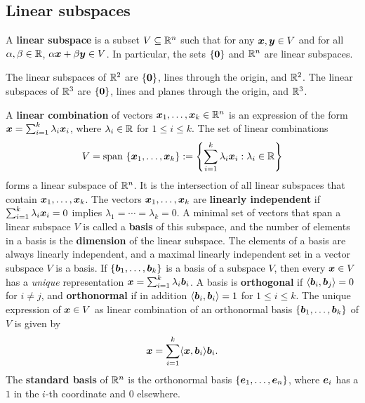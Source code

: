 \subsection{Linear subspaces}
A \textbf{linear subspace} is a subset $V\subseteq \mathbb{R}^n$ such that for any $\bm{x},\bm{y}\in V$ and for all $\alpha,\beta\in \mathbb{R}$, $\alpha \bm{x}+\beta \bm{y}\in V$. In particular, the sets $\{\bm{0}\}$ and $\mathbb{R}^n$ are linear subspaces. 

\begin{example}
The linear subspaces of $\mathbb{R}^2$ are $\{\bm{0}\}$, lines through the origin, and $\mathbb{R}^2$. The linear subspaces of $\mathbb{R}^3$ are $\{\bm{0}\}$, lines and planes through the origin, and $\mathbb{R}^3$.
\end{example}

A \textbf{linear combination} of vectors $\bm{x}_1,\dots,\bm{x}_k\in \mathbb{R}^n$ 
is an expression of the form $\bm{x}=\sum_{i=1}^k \lambda_i \bm{x}_i$, where $\lambda_i\in \mathbb{R}$ for $1\leq i\leq k$. The set of linear combinations
\begin{equation*}
 V = \mathrm{span}\ \{\bm{x}_1,\dots,\bm{x}_k\} := \left\{\sum_{i=1}^k \lambda_i \bm{x}_i \mathrel{\mathop{:}} \lambda_i\in \mathbb{R}\right\}
\end{equation*}
forms a linear subspace of $\mathbb{R}^n$. It is the intersection of all linear subspaces that contain $\bm{x}_1,\dots,\bm{x}_k$. 
The vectors $\bm{x}_1,\dots,\bm{x}_k$ are \textbf{linearly independent} if $\sum_{i=1}^k \lambda_i\bm{x}_i=0$ implies $\lambda_1=\cdots=\lambda_k=0$. A minimal set of vectors that span a linear subspace $V$ is called
a \textbf{basis} of this subspace, and the number of elements in a basis is the \textbf{dimension} of the linear subspace. The elements of a basis are always linearly independent, and a maximal linearly independent set in a vector subspace $V$ is a basis.
If $\{\bm{b}_1,\dots,\bm{b}_k\}$ is a basis of a subspace $V$, then every $\bm{x}\in V$ has a {\em unique} representation $\bm{x}=\sum_{i=1}^k \lambda_i \bm{b}_i$.
A basis is \textbf{orthogonal} if $\langle {\bm{b}_i}, {\bm{b}_j} \rangle=0$ for $i\neq j$, and \textbf{orthonormal} if in addition $\langle {\bm{b}_i}, {\bm{b}_i} \rangle=1$ for $1\leq i\leq k$. The unique expression of $\bm{x}\in V$ as linear combination of an orthonormal basis $\{\bm{b}_1,\dots,\bm{b}_k\}$ of $V$ is given by
\begin{equation*}
 \bm{x} = \sum_{i=1}^k \langle {\bm{x}}, {\bm{b}_i} \rangle \bm{b}_i.
\end{equation*}
The \textbf{standard basis} of $\mathbb{R}^n$ is the orthonormal basis $\{\bm{e}_1,\dots,\bm{e}_n\}$, where $\bm{e}_i$ has a $1$ in the $i$-th coordinate and $0$ elsewhere.

